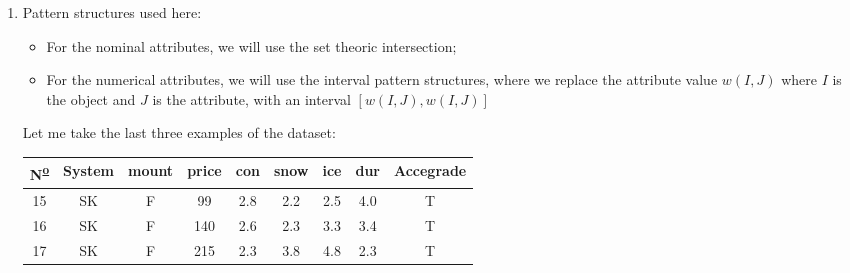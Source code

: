 \documentclass[12pt]{report}
\begin{document}
\begin{solution}
    \begin{enumerate}
        \item Pattern structures used here:
        \begin{itemize}
            \item For the nominal attributes, we will use the set theoric intersection;
            \item For the numerical attributes, we will use the interval pattern structures, where we replace the attribute value $w(I,J)$ where $I$ is the object and $J$ is the attribute, with an interval $[w(I, J), w(I,J)]$
        \end{itemize}
        Let me take the last three examples of the dataset:
        \begin{table}[H]
            \centering
            \begin{tabular}{|c|c|c|c|c|c|c|c|c|}
            \hline
            N\textsuperscript{\underline{o}}  & System & mount & price & con & snow & ice & dur & Accegrade \\ \hline
            15 & SK     & F     & 99    & 2.8  & 2.2  & 2.5 & 4.0 & T         \\ \hline
            16 & SK     & F     & 140   & 2.6 & 2.3  & 3.3 & 3.4 & T         \\ \hline
            17 & SK     & F     & 215   & 2.3 & 3.8  & 4.8 & 2.3 & T         \\ \hline
            \end{tabular}
            \end{table}

\end{enumerate}
\end{solution}
\end{document}
